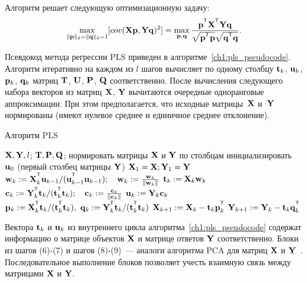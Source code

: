 Алгоритм решает следующую оптимизационную задачу:
\begin{equation}
	\max_{\|\bp\|_{2}=\|\bq\|_{2}=1}[ cov(\bX \bp, \bY \bq)^{2}] = \max_{\bp, \bq} \frac{\bp^{\T} \bX^{\T} \bY \bq}{\sqrt{\bp^{\T} \bp} \sqrt{\bq^{\T} \bq}}.
	\label{ch1:eq:pls_max_cov}
\end{equation}

Псевдокод метода регрессии PLS приведен в алгоритме~\ref{ch1:pls_pseudocode}.
Алгоритм итеративно на каждом из $l$ шагов вычисляет по одному столбцу $\mathbf{t}_k$, $\mathbf{u}_k$, $\mathbf{p}_k$, $\mathbf{q}_k$ матриц $\mathbf{T}$, $\mathbf{U}$, $\mathbf{P}$, $\mathbf{Q}$ соответственно. 
После вычисления следующего набора векторов из матриц $\mathbf{X}$, $\mathbf{Y}$ вычитаются очередные одноранговые аппроксимации. 
При этом предполагается, что исходные матрицы~$\mathbf{X}$ и~$\mathbf{Y}$ нормированы (имеют нулевое среднее и единичное среднее отклонение).

\begin{algorithm}[h]
	\caption{Алгоритм PLS}
	\label{ch1:pls_pseudocode}
	\begin{algorithmic}[1]
		\REQUIRE $\mathbf{X}, \mathbf{Y}, l$;
		\ENSURE $\mathbf{T}, \mathbf{P}, \mathbf{Q}$;
		\STATE нормировать матрицы $\mathbf{X}$ и $\mathbf{Y}$ по столбцам
		\STATE инициализировать $\mathbf{u}_0$ (первый столбец матрицы $\mathbf{Y}$)
		\STATE $\mathbf{X}_1 = \mathbf{X}; \mathbf{Y}_1 = \mathbf{Y}$
		\REPEAT
		\vspace{0.1cm}
		\STATE $\bw_k := \bX_k^{\T} \bu_{k-1} / (\bu_{k-1}^{\T} \bu_{k-1}); \quad \bw_k: = \frac{\bw_k}{\| \bw_k \|}$
		\vspace{0.1cm}
		\STATE $\mathbf{t}_k := \mathbf{X}_k \mathbf{w}_k$
		\vspace{0.1cm}
		\STATE $\bc_k := \bY_k^{\T} \bt_k / (\bt_k^{\T} \bt_k); \quad \bc_k: = \frac{\bc_k}{\| \bc_k \|}$
		\vspace{0.1cm}
		\STATE $\mathbf{u}_k := \mathbf{Y}_k \mathbf{c}_k$
		\vspace{0.1cm}
		\STATE $\bp_k:= \bX_k^{\T}\bt_k/(\bt_k^{\T}\bt_k),\ 
		\bq_k := \bY_k^{\T}\bt_k/(\bt_k^{\T}\bt_k)$
		\vspace{0.2cm}
		\STATE $\bX_{k+1} :=  \bX_k - \bt_k \bp_k^{\T}$
		\vspace{0.2cm}
		\STATE $\bY_{k + 1} :=  \bY_k - \bt_k \bq_k^{\T}$ 
		\ENDFOR
	\end{algorithmic}
\end{algorithm}

Вектора $\mathbf{t}_k$ и $\mathbf{u}_k$ из внутреннего цикла алгоритма~\ref{ch1:pls_pseudocode}
содержат информацию о матрице объектов $\mathbf{X}$ и матрице ответов $\mathbf{Y}$ соответственно. 
Блоки из шагов (6)-(7) и шагов (8)-(9)~--- аналоги алгоритма PCA для матриц $\mathbf{X}$ и $\mathbf{Y}$~\cite{geladi1988pls}. 
Последовательное выполнение блоков позволяет учесть взаимную связь между матрицами $\mathbf{X}$ и $\mathbf{Y}$.

